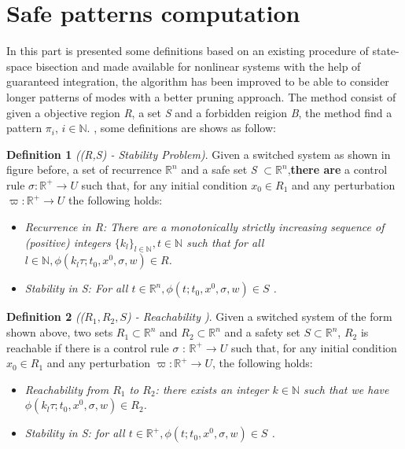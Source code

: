 \section{Safe patterns computation}
\label{sec:safepatterncomputation}
    In this part is presented some definitions based on an existing 
    procedure of state-space bisection and made available for nonlinear 
    systems  with the help of guaranteed integration, the algorithm has
    been  improved to be able to consider longer patterns of modes with a better
    pruning approach. The method consist of given a objective region 
    \emph{R}, a set \emph{S} and a forbidden reigion \emph{B}, the method find a pattern $\pi_i$, $i \in 
    \mathbb{N}$. \cite{le2016distributed}, some definitions are shows as follow:

    \textbf{Definition 1} \emph{((R,S) - Stability Problem)}. Given a 
    switched system as shown in figure before, a set of recurrence 
    ${\mathbb{R}^n}$ and a safe set \emph{S}
    ${\subset \mathbb{R}^n}$,\textbf{there are} a control rule 
    ${\sigma : \mathbb{R}^+ \rightarrow U}$ such that, for any
    initial condition ${x_0  \in  R_1}$ and any perturbation 
    ${\varpi :\mathbb{R}^+\rightarrow U}$  the
    following holds:
    
    \begin{itemize}
        \item \emph{ Recurrence in \emph{R}: There are a monotonically 
        strictly increasing sequence of (positive) integers
        ${\lbrace k_l \rbrace_{l \in \mathbb{N}} , t \in \mathbb{N}}$ such 
        that for all ${ l \in \mathbb{N}, \phi(k_l\tau;t_0,x^0,\sigma,w) \in R }$.}
        \item \emph{ Stability in \emph{S}: For all ${ t \in \mathbb{R}^n,
        \phi(t;t_0,x^0,\sigma,w) \in S}$ .}
    \end{itemize}
    
    \textbf{Definition 2} \emph{((${R_1,R_2,S}$) - Reachability )}. %
        Given a switched system of the form shown above, two sets  
        ${ R_1 \subset \mathbb{R}^n}$  and ${ R_2 \subset \mathbb{R}^n}$ 
        and a safety set  ${S \subset  \mathbb{R}^n}$, $R_2$ is reachable if
        there is a control rule  ${\sigma}$ :
        ${\mathbb{R}^+\rightarrow U}$ such that, for any initial condition 
        ${x_0  \in  R_1}$ and any perturbation  ${\varpi : \mathbb{R}^+  
        \rightarrow U}$, the following holds:
    
    \begin{itemize}
        \item  \emph{Reachability from ${R_1}$ to ${R_2}$: there exists 
        an integer ${k \in \mathbb{N} }$ such that we have ${ \phi( k_l\tau
        ;t_0,x^0,\sigma,w) \in R_2 }$.}
        \item \emph{ Stability in S: for all ${ t \in \mathbb{R}^+, 
        \phi(t;t_0,x^0,\sigma,w) \in S}$ .}
    \end{itemize}
    
